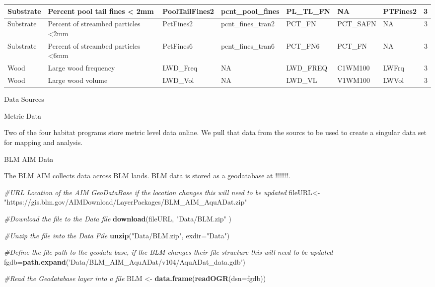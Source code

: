 \documentclass[]{article}
\newenvironment{Shaded}{\begin{snugshade}}{\end{snugshade}}
\newcommand{\CommentTok}[1]{\textcolor[rgb]{0.56,0.35,0.01}{\textit{#1}}}
\newcommand{\DataTypeTok}[1]{\textcolor[rgb]{0.13,0.29,0.53}{#1}}
\newcommand{\KeywordTok}[1]{\textcolor[rgb]{0.13,0.29,0.53}{\textbf{#1}}}
\newcommand{\NormalTok}[1]{#1}
\newcommand{\StringTok}[1]{\textcolor[rgb]{0.31,0.60,0.02}{#1}}
\begin{document}
\begin{table}[H]
\begin{tabular}{l|l|l|l|l|l|l|r}
\hline
Substrate & Percent pool tail fines < 2mm & PoolTailFines2 & pcnt\_pool\_fines & PL\_TL\_FN & NA & PTFines2 & 3\\
\hline
Substrate & Percent of streambed particles <2mm & PctFines2 & pcnt\_fines\_tran2 & PCT\_FN & PCT\_SAFN & NA & 3\\
\hline
Substrate & Percent of streambed particles <6mm & PctFines6 & pcnt\_fines\_tran6 & PCT\_FN6 & PCT\_FN & NA & 3\\
\hline
Wood & Large wood frequency & LWD\_Freq & NA & LWD\_FREQ & C1WM100 & LWFrq & 3\\
\hline
Wood & Large wood volume & LWD\_Vol & NA & LWD\_VL & V1WM100 & LWVol & 3\\
\hline
\end{tabular}
\end{table}

Data Sources

Metric Data

Two of the four habitat programs store metric level data online. We pull
that data from the sourcs to be used to create a singular data set for
mapping and analysis.

BLM AIM Data

The BLM AIM collects data across BLM lands. BLM data is stored as a
geodatabase at !!!!!!!.

\begin{Shaded}
\begin{Highlighting}[]
\CommentTok{#URL Location of the AIM GeoDataBase if the location changes this will need to be updated }
\NormalTok{fileURL<-}\StringTok{ "https://gis.blm.gov/AIMDownload/LayerPackages/BLM_AIM_AquADat.zip"}

\CommentTok{#Download the file to the Data file}
\KeywordTok{download}\NormalTok{(fileURL, }\StringTok{"Data/BLM.zip"}\NormalTok{ )}

\CommentTok{#Unzip the file into the Data File }
\KeywordTok{unzip}\NormalTok{(}\StringTok{"Data/BLM.zip"}\NormalTok{, }\DataTypeTok{exdir=}\StringTok{"Data"}\NormalTok{)}

\CommentTok{#Define the file path to the geodata base, if the BLM changes their file structure this will need to be updated }
\NormalTok{fgdb=}\KeywordTok{path.expand}\NormalTok{(}\StringTok{'Data/BLM_AIM_AquADat/v104/AquADat_data.gdb'}\NormalTok{)}

\CommentTok{#Read the Geodatabase layer into a file }
\NormalTok{BLM <-}\StringTok{ }\KeywordTok{data.frame}\NormalTok{(}\KeywordTok{readOGR}\NormalTok{(}\DataTypeTok{dsn=}\NormalTok{fgdb))}
\end{Highlighting}
\end{Shaded}
\end{document}
